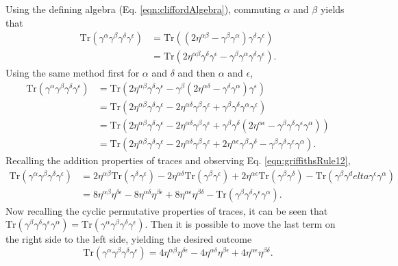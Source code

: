 Using the defining algebra (Eq. \eqref{eqn:cliffordAlgebra}), commuting $\alpha$ and $\beta$ yields
that
\begin{align*}
\text{Tr}(\gamma^\alpha\gamma^\beta\gamma^\delta\gamma^\epsilon)&=\text{Tr}((2\eta^{\alpha\beta}-\gamma^\beta\gamma^\alpha)\gamma^\delta\gamma^\epsilon)\\
&=\text{Tr}(2\eta^{\alpha\beta}\gamma^\delta\gamma^\epsilon-\gamma^\beta\gamma^\alpha\gamma^\delta\gamma^\epsilon).
\end{align*}
Using the same method first for $\alpha$ and $\delta$ and then $\alpha$ and $\epsilon$,
\begin{align*}
\text{Tr}(\gamma^\alpha\gamma^\beta\gamma^\delta\gamma^\epsilon)
&=\text{Tr}(2\eta^{\alpha\beta}\gamma^\delta\gamma^\epsilon-\gamma^\beta(2\eta^{\alpha\delta}-\gamma^\delta\gamma^\alpha)\gamma^\epsilon)\\
&=\text{Tr}(2\eta^{\alpha\beta}\gamma^\delta\gamma^\epsilon-2\eta^{\alpha\delta}\gamma^\beta\gamma^\epsilon+\gamma^\beta\gamma^\delta\gamma^\alpha\gamma^\epsilon)\\
&=\text{Tr}(2\eta^{\alpha\beta}\gamma^\delta\gamma^\epsilon-2\eta^{\alpha\delta}\gamma^\beta\gamma^\epsilon+\gamma^\beta\gamma^\delta(2\eta^{\alpha\epsilon}-\gamma^\beta\gamma^\delta\gamma^\epsilon\gamma^\alpha))\\
&=\text{Tr}(2\eta^{\alpha\beta}\gamma^\delta\gamma^\epsilon-2\eta^{\alpha\delta}\gamma^\beta\gamma^\epsilon+2\eta^{\alpha\epsilon}\gamma^\beta\gamma^\delta-\gamma^\beta\gamma^\delta\gamma^\epsilon\gamma^\alpha).
\end{align*}
Recalling the addition properties of traces and observing Eq. \eqref{eqn:griffithsRule12},
\begin{align*}
\text{Tr}(\gamma^\alpha\gamma^\beta\gamma^\delta\gamma^\epsilon)
&=2\eta^{\alpha\beta}\text{Tr}(\gamma^\delta\gamma^\epsilon)-2\eta^{\alpha\delta}\text{Tr}(\gamma^\beta\gamma^\epsilon)+2\eta^{\alpha\epsilon}\text{Tr}(\gamma^\beta\gamma^\delta)-\text{Tr}(\gamma^\beta\gamma^delta\gamma^\epsilon\gamma^\alpha)\\
&=8\eta^{\alpha\beta}\eta^{\delta\epsilon}-8\eta^{\alpha\delta}\eta^{\beta\epsilon}+8\eta^{\alpha\epsilon}\eta^{\beta\delta}-\text{Tr}(\gamma^\beta\gamma^\delta\gamma^\epsilon\gamma^\alpha).
\end{align*}
Now recalling the cyclic permutative properties of traces, it can be seen that $\text{Tr}(\gamma^\beta\gamma^\delta\gamma^\epsilon\gamma^\alpha)=\text{Tr}(\gamma^\alpha\gamma^\beta\gamma^\delta\gamma^\epsilon)$. Then it is possible to move the last term on the right side to the left side, yielding the desired outcome
\begin{equation}\label{eqn:griffithsRule13}
\text{Tr}(\gamma^\alpha\gamma^\beta\gamma^\delta\gamma^\epsilon)=4\eta^{\alpha\beta}\eta^{\delta\epsilon}-4\eta^{\alpha\delta}\eta^{\beta\epsilon}+4\eta^{\alpha\epsilon}\eta^{\beta\delta}.
\end{equation}
 \label{apx:code}

